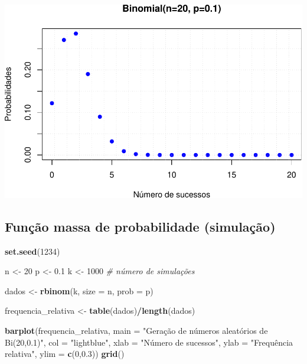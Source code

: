 \documentclass[
]{book}
\newenvironment{Shaded}{\begin{snugshade}}{\end{snugshade}}
\newcommand{\AttributeTok}[1]{\textcolor[rgb]{0.13,0.29,0.53}{#1}}
\newcommand{\CommentTok}[1]{\textcolor[rgb]{0.56,0.35,0.01}{\textit{#1}}}
\newcommand{\DecValTok}[1]{\textcolor[rgb]{0.00,0.00,0.81}{#1}}
\newcommand{\FloatTok}[1]{\textcolor[rgb]{0.00,0.00,0.81}{#1}}
\newcommand{\FunctionTok}[1]{\textcolor[rgb]{0.13,0.29,0.53}{\textbf{#1}}}
\newcommand{\NormalTok}[1]{#1}
\newcommand{\OtherTok}[1]{\textcolor[rgb]{0.56,0.35,0.01}{#1}}
\newcommand{\SpecialCharTok}[1]{\textcolor[rgb]{0.81,0.36,0.00}{\textbf{#1}}}
\newcommand{\StringTok}[1]{\textcolor[rgb]{0.31,0.60,0.02}{#1}}
\begin{document}
\includegraphics{introR_files/figure-latex/unnamed-chunk-255-1.pdf}

\subsection{Função massa de probabilidade (simulação)}\label{funuxe7uxe3o-massa-de-probabilidade-simulauxe7uxe3o}

\begin{Shaded}
\begin{Highlighting}[]
\FunctionTok{set.seed}\NormalTok{(}\DecValTok{1234}\NormalTok{)}

\NormalTok{n }\OtherTok{\textless{}{-}} \DecValTok{20}
\NormalTok{p }\OtherTok{\textless{}{-}} \FloatTok{0.1}
\NormalTok{k }\OtherTok{\textless{}{-}} \DecValTok{1000} \CommentTok{\# número de simulações}

\NormalTok{dados }\OtherTok{\textless{}{-}} \FunctionTok{rbinom}\NormalTok{(k, }\AttributeTok{size =}\NormalTok{ n, }\AttributeTok{prob =}\NormalTok{ p)}

\NormalTok{frequencia\_relativa }\OtherTok{\textless{}{-}} \FunctionTok{table}\NormalTok{(dados)}\SpecialCharTok{/}\FunctionTok{length}\NormalTok{(dados)}

\FunctionTok{barplot}\NormalTok{(frequencia\_relativa,}
        \AttributeTok{main =} \StringTok{"Geração de números aleatórios de Bi(20,0.1)"}\NormalTok{,}
        \AttributeTok{col =} \StringTok{"lightblue"}\NormalTok{,}
        \AttributeTok{xlab =} \StringTok{"Número de sucessos"}\NormalTok{,}
        \AttributeTok{ylab =} \StringTok{"Frequência relativa"}\NormalTok{,}
        \AttributeTok{ylim =} \FunctionTok{c}\NormalTok{(}\DecValTok{0}\NormalTok{,}\FloatTok{0.3}\NormalTok{))}
\FunctionTok{grid}\NormalTok{()}
\end{Highlighting}
\end{Shaded}
\end{document}
